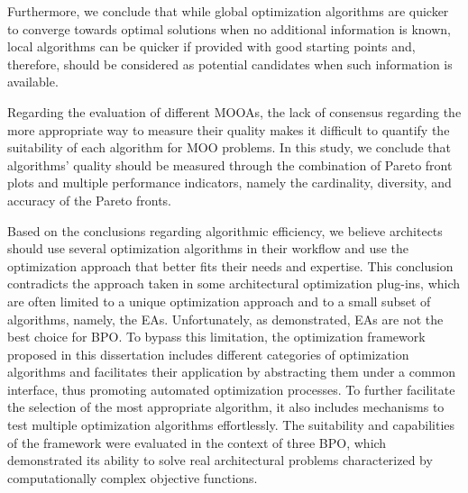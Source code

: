 Furthermore, we conclude that while global optimization algorithms are quicker to converge towards optimal solutions when no additional information is known, local algorithms can be quicker if provided with good starting points and, therefore, should be considered as potential candidates when such information is available.

Regarding the evaluation of different \acp{MOOA}, the lack of consensus regarding the more appropriate way to measure their quality makes it difficult to quantify the suitability of each algorithm for \ac{MOO} problems. In this study, we conclude that algorithms' quality should be measured through the combination of Pareto front plots and multiple performance indicators, namely the cardinality, diversity, and accuracy of the Pareto fronts. %
 
Based on the conclusions regarding algorithmic efficiency, we believe architects should use several optimization algorithms in their workflow and use the optimization approach that better fits their needs and expertise. This conclusion contradicts the approach taken in some architectural optimization plug-ins, which are often limited to a unique optimization approach and to a small subset of algorithms, namely, the \acp{EA}. Unfortunately, as demonstrated, \acp{EA} are not the best choice for \ac{BPO}. To bypass this limitation, the optimization framework proposed in this dissertation includes different categories of optimization algorithms and facilitates their application by abstracting them under a common interface, thus promoting automated optimization processes. To further facilitate the selection of the most appropriate algorithm, it also includes mechanisms to test multiple optimization algorithms effortlessly. The suitability and capabilities of the framework were evaluated in the context of three \ac{BPO}, which demonstrated its ability to solve real architectural problems characterized by computationally complex objective functions.

